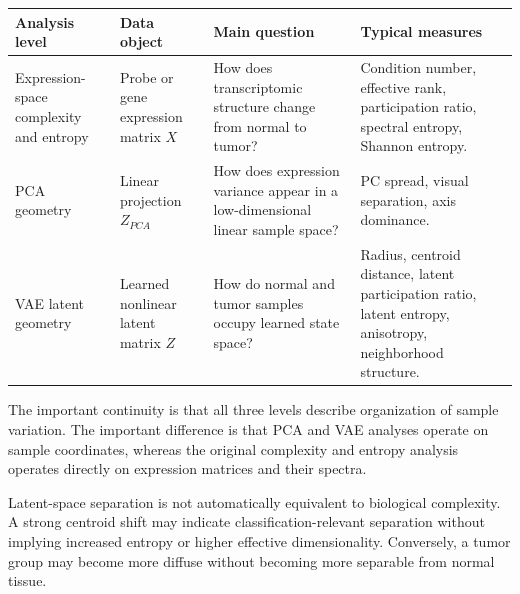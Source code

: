\documentclass[
  letterpaper,
  DIV=11,
  numbers=noendperiod,
  openany,
  oneside]{scrreprt}
\begin{document}
\begin{longtable}[]{@{}
  >{\raggedright\arraybackslash}p{}
  >{\raggedright\arraybackslash}p{}
  >{\raggedright\arraybackslash}p{}
  >{\raggedright\arraybackslash}p{}@{}}
\toprule\noalign{}
\begin{minipage}[b]{\linewidth}\raggedright
Analysis level
\end{minipage} & \begin{minipage}[b]{\linewidth}\raggedright
Data object
\end{minipage} & \begin{minipage}[b]{\linewidth}\raggedright
Main question
\end{minipage} & \begin{minipage}[b]{\linewidth}\raggedright
Typical measures
\end{minipage} \\
\midrule\noalign{}
\endhead
\bottomrule\noalign{}
\endlastfoot
Expression-space complexity and entropy & Probe or gene expression
matrix \(X\) & How does transcriptomic structure change from normal to
tumor? & Condition number, effective rank, participation ratio, spectral
entropy, Shannon entropy. \\
PCA geometry & Linear projection \(Z_{PCA}\) & How does expression
variance appear in a low-dimensional linear sample space? & PC spread,
visual separation, axis dominance. \\
VAE latent geometry & Learned nonlinear latent matrix \(Z\) & How do
normal and tumor samples occupy learned state space? & Radius, centroid
distance, latent participation ratio, latent entropy, anisotropy,
neighborhood structure. \\
\end{longtable}

The important continuity is that all three levels describe organization
of sample variation. The important difference is that PCA and VAE
analyses operate on sample coordinates, whereas the original complexity
and entropy analysis operates directly on expression matrices and their
spectra.

\begin{tcolorbox}[enhanced jigsaw, opacityback=0, colframe=quarto-callout-warning-color-frame, toptitle=1mm, colback=white, breakable, toprule=.15mm, bottomrule=.15mm, opacitybacktitle=0.6, title=\textcolor{quarto-callout-warning-color}{\faExclamationTriangle}\hspace{0.5em}{Warning}, coltitle=black, rightrule=.15mm, leftrule=.75mm, left=2mm, bottomtitle=1mm, titlerule=0mm, colbacktitle=quarto-callout-warning-color!10!white, arc=.35mm]

Latent-space separation is not automatically equivalent to biological
complexity. A strong centroid shift may indicate classification-relevant
separation without implying increased entropy or higher effective
dimensionality. Conversely, a tumor group may become more diffuse
without becoming more separable from normal tissue.

\end{tcolorbox}
\end{document}
